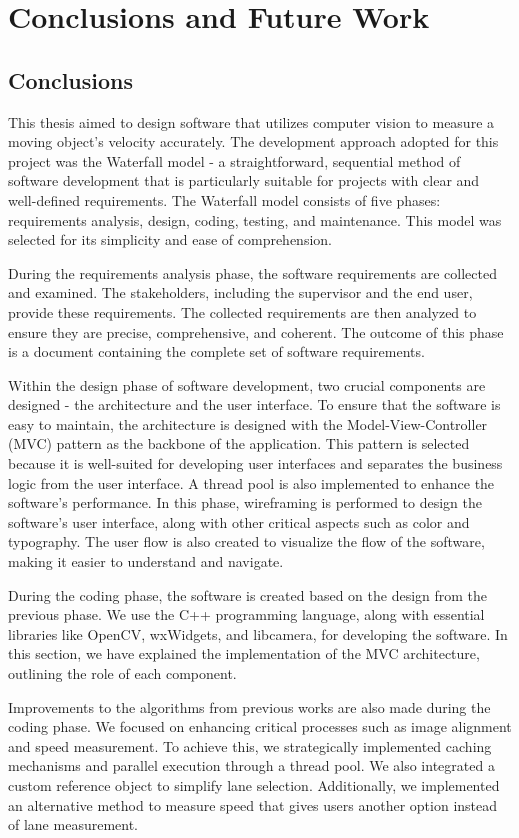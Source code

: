 \chapter{Conclusions and Future Work}

\section{Conclusions}
This thesis aimed to design software that utilizes computer vision to measure a moving object's velocity accurately. The development approach adopted for this project was the Waterfall model - a straightforward, sequential method of software development that is particularly suitable for projects with clear and well-defined requirements. The Waterfall model consists of five phases: requirements analysis, design, coding, testing, and maintenance. This model was selected for its simplicity and ease of comprehension.

During the requirements analysis phase, the software requirements are collected and examined. The stakeholders, including the supervisor and the end user, provide these requirements. The collected requirements are then analyzed to ensure they are precise, comprehensive, and coherent. The outcome of this phase is a document containing the complete set of software requirements.

Within the design phase of software development, two crucial components are designed - the architecture and the user interface. To ensure that the software is easy to maintain, the architecture is designed with the Model-View-Controller (MVC) pattern as the backbone of the application. This pattern is selected because it is well-suited for developing user interfaces and separates the business logic from the user interface. A thread pool is also implemented to enhance the software's performance. In this phase, wireframing is performed to design the software's user interface, along with other critical aspects such as color and typography. The user flow is also created to visualize the flow of the software, making it easier to understand and navigate.

During the coding phase, the software is created based on the design from the previous phase. We use the C++ programming language, along with essential libraries like OpenCV, wxWidgets, and libcamera, for developing the software. In this section, we have explained the implementation of the MVC architecture, outlining the role of each component.

Improvements to the algorithms from previous works are also made during the coding phase. We focused on enhancing critical processes such as image alignment and speed measurement. To achieve this, we strategically implemented caching mechanisms and parallel execution through a thread pool. We also integrated a custom reference object to simplify lane selection. Additionally, we implemented an alternative method to measure speed that gives users another option instead of lane measurement.

